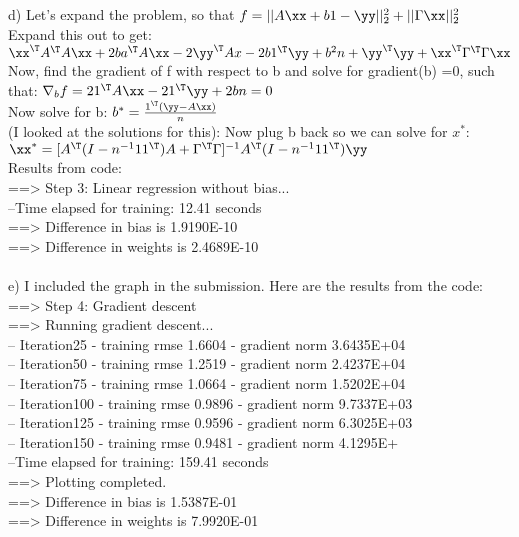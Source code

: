 \documentclass[12pt,letterpaper]{hmcpset}
\begin{document}
\begin{solution}
d) Let's expand the problem, so that $f = ||A\xx + b1 - \yy||^2_2 + ||\Gamma \xx ||^2_2 $\\
Expand this out to get: $ \xx^\T A^\T A\xx + 2ba^\T A\xx -2\yy^\T Ax - 2b1^\T\yy + b^2n +\yy^\T \yy + \xx^\T \Gamma^\T \Gamma \xx $ \\
Now, find the gradient of f with respect to b and solve for gradient(b) =0, such that: $\nabla_b f = 21^\T A\xx - 21^\T \yy + 2bn = 0$\\
Now solve for b: $b^* = \frac{1^\T (\yy - A\xx)}{n} $\\
(I looked at the solutions for this): Now plug b back so we can solve for $x^*$: \\$
\xx^* = [A^\T (I - n^{-1}11^\T)A + \Gamma^\T \Gamma ]^{-1} A^\T(I - n^{-1}11^\T)\yy $ \\
Results from code:\\
==> Step 3: Linear regression without bias...\\
--Time elapsed for training: 12.41 seconds\\
==> Difference in bias is  1.9190E-10\\
==> Difference in weights is  2.4689E-10\\
\\
e) I included the graph in the submission. Here are the results from the code:\\

==> Step 4: Gradient descent\\
==> Running gradient descent...\\
-- Iteration25 - training rmse  1.6604 - gradient norm  3.6435E+04\\
-- Iteration50 - training rmse  1.2519 - gradient norm  2.4237E+04\\
-- Iteration75 - training rmse  1.0664 - gradient norm  1.5202E+04\\
-- Iteration100 - training rmse  0.9896 - gradient norm  9.7337E+03\\
-- Iteration125 - training rmse  0.9596 - gradient norm  6.3025E+03\\
-- Iteration150 - training rmse  0.9481 - gradient norm  4.1295E+\\
--Time elapsed for training: 159.41 seconds\\
==> Plotting completed.\\
==> Difference in bias is  1.5387E-01\\
==> Difference in weights is  7.9920E-01\\








\end{solution}
\newpage
\end{document}
